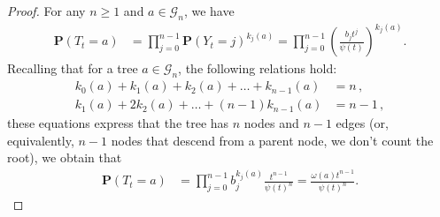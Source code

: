 \documentclass[10pt,a4paper]{amsart}
\def\P{\mathbf{P}}
\begin{document}
	\begin{proof} 
		For any \( n \geq 1 \) and \( a \in \mathcal{G}_n \), we have
		\begin{align*}
			\P(T_t = a) &= \prod_{j = 0}^{n-1} \P(Y_t = j)^{k_j(a)} 
			= \prod_{j = 0}^{n-1} \left( \frac{b_j t^j}{\psi(t)} \right)^{k_j(a)}.
		\end{align*}
		Recalling that for a tree \( a \in \mathcal{G}_n \), the following relations hold:
		\begin{align*}
			k_0(a) + k_1(a) + k_2(a) + \dots + k_{n-1}(a) &= n\,, \\
			k_1(a) + 2k_2(a) + \dots + (n-1)k_{n-1}(a) &= n-1\,,
		\end{align*}
		these equations express that the tree has \( n \) nodes and \( n-1 \) edges (or, equivalently, $n-1$ nodes that descend from a parent node, we don't count the root), we obtain that
		\begin{align*}
			\P(T_t = a) &= \prod_{j = 0}^{n-1} b_j^{k_j(a)} \frac{t^{n-1}}{\psi(t)^n} 
			= \frac{\omega(a)t^{n-1}}{\psi(t)^n}.
		\end{align*}
	\end{proof}
\end{document}
